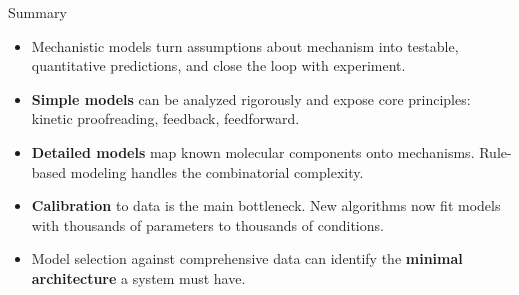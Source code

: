 \documentclass[aspectratio=169,10pt,t]{beamer}
\begin{document}
\begin{frame}{Summary}
  \begin{itemize}[<+->]
    \setlength\itemsep{2mm}
    \item Mechanistic models turn assumptions about mechanism into testable,
          quantitative predictions, and close the loop with experiment.
    \item \textbf{Simple models} can be analyzed rigorously and expose core principles:
          kinetic proofreading, feedback, feedforward.
    \item \textbf{Detailed models} map known molecular components onto mechanisms.
          Rule-based modeling handles the combinatorial complexity.
    \item \textbf{Calibration} to data is the main bottleneck. New algorithms now fit
          models with thousands of parameters to thousands of conditions.
    \item Model selection against comprehensive data can identify the \textbf{minimal
          architecture} a system must have.
  \end{itemize}
\end{frame}
\end{document}
